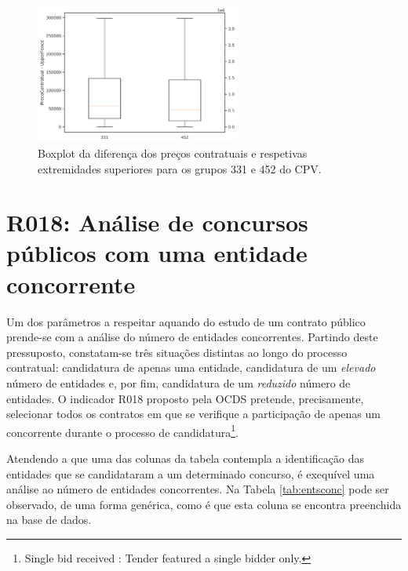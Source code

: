\begin{figure}[H]
	\centering
	\includegraphics[width=0.6\textwidth]{imagens/r017/diffs.png}
	\caption{Boxplot da diferença dos preços contratuais e respetivas extremidades superiores para os grupos 331 e 452 do CPV.}
	\label{fig:diffscpvs}
\end{figure}




















\section{R018: Análise de concursos públicos com uma entidade concorrente}
\label{ch:entis}

Um dos parâmetros a respeitar aquando do estudo de um contrato público prende-se com a análise do número de entidades concorrentes. Partindo deste pressuposto, constatam-se três situações distintas ao longo do processo contratual: candidatura de apenas uma entidade, candidatura de um \textit{elevado} número de entidades e, por fim, candidatura de um \textit{reduzido} número de entidades. O indicador R018 proposto pela OCDS pretende, precisamente,  selecionar todos os contratos em que se verifique a participação de apenas um concorrente durante o processo de candidatura\footnote{Single bid received : Tender featured a single bidder only.}.

Atendendo a  que uma das colunas da tabela contempla a  identificação das entidades que se candidataram a um determinado concurso, é exequível uma análise ao número de entidades concorrentes. Na Tabela \ref{tab:entsconc} pode ser observado, de uma forma genérica, como é que esta coluna se encontra preenchida na base de dados. 


